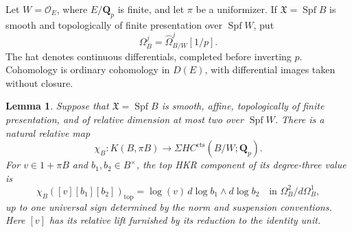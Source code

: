 \documentclass[11pt,a4paper]{amsart}
\numberwithin{equation}{section}
\newtheorem{lemma}[theorem]{Lemma}
\theoremstyle{definition}
\theoremstyle{remark}
\begin{document}
Let $W=\mathcal O_E$, where $E/\mathbf Q_p$ is finite, and let $\pi$
be a uniformizer. If $\mathfrak X=\operatorname{Spf}B$ is smooth and
topologically of finite presentation over $\operatorname{Spf}W$, put
\[
 \Omega_B^j=\widehat\Omega^j_{B/W}[1/p].
\]
The hat denotes continuous differentials, completed before inverting
$p$. Cohomology is ordinary cohomology in $D(E)$, with differential images taken without closure.

\begin{lemma}
\label{d3:lem:relativelogproduct}
Suppose that $\mathfrak X=\operatorname{Spf}B$ is smooth, affine,
topologically of finite presentation, and of relative dimension at
most two over $\operatorname{Spf}W$. There is a natural relative map
\[
 \chi_B:K(B,\pi B)\longrightarrow
                  \Sigma HC^{\mathrm{cts}}(B/W;\mathbf Q_p).
\]
For $v\in1+\pi B$ and $b_1,b_2\in B^\times$, the top HKR component
of its degree-three value is
\begin{equation}\label{d3:eq:tcreviewlogproduct}
 \chi_B([v][b_1][b_2])_{\mathrm{top}}
   =\log(v)\,d\log b_1\wedge d\log b_2
       \quad\text{in }\Omega_B^2/d\Omega_B^1,
\end{equation}
up to one universal sign determined by the norm and suspension
conventions. Here $[v]$ has its relative lift furnished by its reduction
to the identity unit.
\end{lemma}
\end{document}
